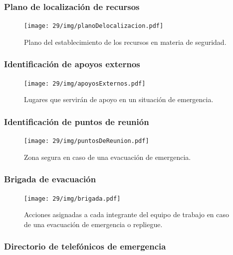     \subsubsection{Plano de localización de recursos}
    
    \begin{figure}[H]
        \centering
        \texttt{[image: 29/img/planoDelocalizacion.pdf]}
        \caption{Plano del establecimiento de los recursos en materia de seguridad.}
        \label{fig:planoDelocalizacion.pdf}
    \end{figure}
    \subsubsection{ Identificación de apoyos externos}
    
    \begin{figure}[H]
        \centering
        \texttt{[image: 29/img/apoyosExternos.pdf]}
        \caption{ Lugares que servirán de apoyo en un situación de emergencia.}
        \label{fig:apoyosExternos.pd}
    \end{figure}
    \subsubsection{Identificación de puntos de reunión}
    
    \begin{figure}[H]
        \centering
        \texttt{[image: 29/img/puntosDeReunion.pdf]}
        \caption{Zona segura en caso de una evacuación de emergencia.}
        \label{fig:puntosDeReunion.pdf}
    \end{figure}
    \subsubsection{Brigada de evacuación}
    
    \begin{figure}[H]
        \centering
        \texttt{[image: 29/img/brigada.pdf]}
        \caption{Acciones asignadas a cada integrante del equipo de trabajo en caso de una evacuación de emergencia o repliegue.}
        \label{fig:brigada.pdf}
    \end{figure}
    \subsubsection{Directorio de telefónicos de emergencia}
    
